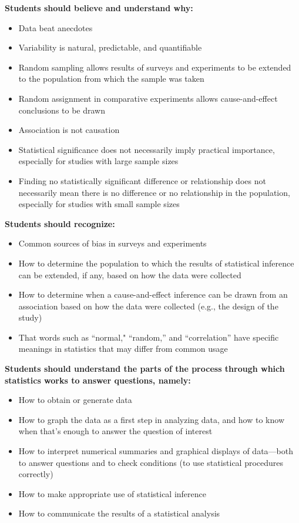 \documentclass[twoside,openany]{tufte-book}
\begin{document}
\noindent\textbf{Students should believe and understand why:}

\begin{itemize}[leftmargin=1cm, itemsep=.2em]
\renewcommand\labelitemi{$\closedsucc$}
\item Data beat anecdotes
\item Variability is natural, predictable, and quantifiable
\item Random sampling allows results of surveys and experiments to be extended to the population from which the sample was taken
\item Random assignment in comparative experiments allows cause-and-effect conclusions to be drawn
\item Association is not causation
\item Statistical significance does not necessarily imply practical importance, especially for studies with large sample sizes
\item Finding no statistically significant difference or relationship does not necessarily mean there is no difference or no relationship in the population, especially for studies with small sample sizes
\end{itemize}

\renewcommand\labelitemi{$\closedsucc$}
\noindent\textbf{Students should recognize:}
\begin{itemize}[leftmargin=1cm, itemsep=.2em]
\item Common sources of bias in surveys and experiments
\item How to determine the population to which the results of statistical inference can be extended, if any, based on how the data were collected
\item How to determine when a cause-and-effect inference can be drawn from an association based on how the data were collected (e.g., the design of the study)
\item That words such as ``normal," ``random,'' and ``correlation'' have specific meanings in statistics that may differ from common usage
\end{itemize}

\noindent\textbf{Students should understand the parts of the process through which statistics works to answer questions, namely:}
\begin{itemize}[leftmargin=1cm, itemsep=.2em]
\item How to obtain or generate data
\item How to graph the data as a first step in analyzing data, and how to know when that's enough to answer the question of interest
\item How to interpret numerical summaries and graphical displays of data---both to answer questions and to check conditions (to use statistical procedures correctly)
\item How to make appropriate use of statistical inference
\item How to communicate the results of a statistical analysis 
\end{itemize}
\end{document}
